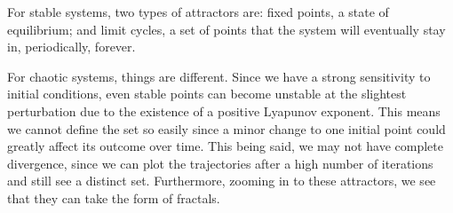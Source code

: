 For stable systems, two types of attractors are: fixed points, a state of equilibrium; and limit cycles, a set of points that the system will eventually stay in, periodically, forever. 

For chaotic systems, things are different. Since we have a strong sensitivity to initial conditions, even stable points can become unstable at the slightest perturbation due to the existence of a positive Lyapunov exponent. This means we cannot define the set so easily since a minor change to one initial point could greatly affect its outcome over time. This being said, we may not have complete divergence, since we can plot the trajectories after a high number of iterations and still see a distinct set. Furthermore, zooming in to these attractors, we see that they can take the form of fractals. 

